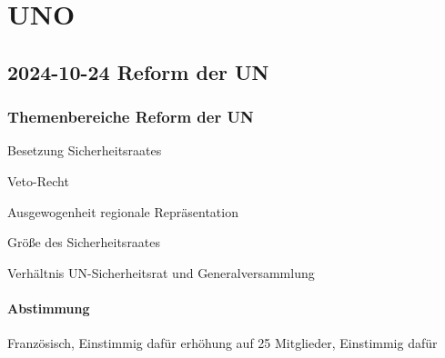 \chapter{UNO}
\section{2024-10-24 Reform der UN}

\subsection{Themenbereiche Reform der UN}

\startitemize[packed,m]
\item Besetzung Sicherheitsraates
\item Veto-Recht
\item Ausgewogenheit regionale Repräsentation
\item Größe des Sicherheitsraates
\item Verhältnis UN-Sicherheitsrat und Generalversammlung
\stopitemize

\subsubsection{Abstimmung}


\bTABLE
\startCSV
Französisch, Einstimmig dafür
erhöhung auf 25 Mitglieder, Einstimmig dafür
\stopCSV
\eTABLE
